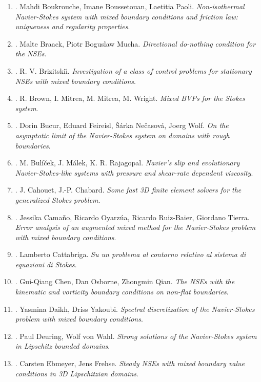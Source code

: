 \documentclass{article}
\begin{document}
\begin{enumerate}
	\item \cite{Boukrouche_Boussetouan_Paoli2014}. {\sc Mahdi Boukrouche, Imane Boussetouan, Laetitia Paoli}. {\it Non-isothermal Navier-Stokes system with mixed boundary conditions and friction law: uniqueness and regularity properties}.
	\item \cite{Braack_Mucha2014}. {\sc Malte Braack, Piotr Boguslaw Mucha}. {\it Directional do-nothing condition for the NSEs}.
	\item \cite{Brizitskii2009}. {\sc R. V. Brizitski\u{\i}}. {\it Investigation of a class of control problems for stationary NSEs with mixed boundary conditions}.
	\item \cite{Brown_Mitrea_Mitrea_Wright2010}. {\sc R. Brown, I. Mitrea, M. Mitrea, M. Wright}. {\it Mixed BVPs for the Stokes system}.
	\item \cite{Bucur_Feireisl_Necasova_Wolf2008}. {\sc Dorin Bucur, Eduard Feireisl, \v{S}\'{a}rka Ne\v{c}asov\'{a}, Joerg Wolf}. {\it On the asymptotic limit of the Navier-Stokes system on domains with rough boundaries}.
	\item \cite{Bulicek_Malek_Rajagopal2007}. {\sc M. Bul\'{i}\v{c}ek, J. M\'{a}lek, K. R. Rajagopal}. {\it Navier's slip and evolutionary {N}avier-{S}tokes-like systems with pressure and shear-rate dependent viscosity}.
	\item \cite{Cahouet_Chabard1988}. {\sc J. Cahouet, J.-P. Chabard}. {\it Some fast 3D finite element solvers for the generalized Stokes problem}.
	\item \cite{Camano_Oyarzua_Ruiz-Baier_Tierra2018}. {\sc Jessika Cama\~{n}o, Ricardo Oyarz\'{u}a,  Ricardo Ruiz-Baier, Giordano Tierra}. {\it Error analysis of an augmented mixed method for the Navier-Stokes problem with mixed boundary conditions}.
	\item \cite{Cattabriga1961}. {\sc Lamberto Cattabriga}. {\it Su un problema al contorno relativo al sistema di equazioni di Stokes}.
	\item \cite{Chen_Osborne_Qian2009}. {\sc Gui-Qiang Chen, Dan Osborne, Zhongmin Qian}. {\it The NSEs with the kinematic and vorticity boundary conditions on non-flat boundaries}.
	\item \cite{Daikh_Yakoubi2017}. {\sc Yasmina Daikh, Driss Yakoubi}. {\it Spectral discretization of the Navier-Stokes problem with mixed boundary conditions}.
	\item \cite{Deuring_von-Walh1995}. {\sc Paul Deuring, Wolf von Wahl}. {\it Strong solutions of the Navier-Stokes system in Lipschitz bounded domains}.
	\item \cite{Ebmeyer_Frehse2001}. {\sc Carsten Ebmeyer, Jens Frehse}. {\it Steady NSEs with mixed boundary value conditions in 3D Lipschitzian domains}.

\end{enumerate}
\end{document}
